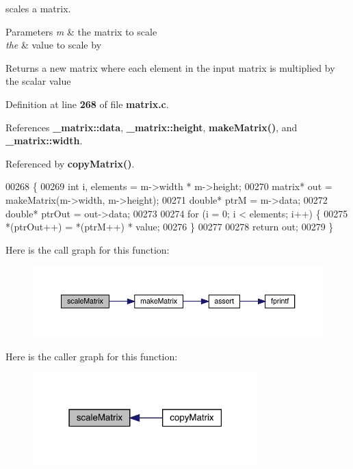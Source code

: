 scales a matrix. 


\begin{DoxyParams}{Parameters}
{\em m} & the matrix to scale \\
\hline
{\em the} & value to scale by \\
\hline
\end{DoxyParams}
\begin{DoxyReturn}{Returns}
a new matrix where each element in the input matrix is multiplied by the scalar value 
\end{DoxyReturn}


Definition at line \textbf{ 268} of file \textbf{ matrix.\+c}.



References \textbf{ \+\_\+matrix\+::data}, \textbf{ \+\_\+matrix\+::height}, \textbf{ make\+Matrix()}, and \textbf{ \+\_\+matrix\+::width}.



Referenced by \textbf{ copy\+Matrix()}.


\begin{DoxyCode}
00268                                              \{
00269     \textcolor{keywordtype}{int} i, elements = m->width * m->height;
00270     matrix* out = makeMatrix(m->width, m->height);
00271     \textcolor{keywordtype}{double}* ptrM = m->data;
00272     \textcolor{keywordtype}{double}* ptrOut = out->data;
00273 
00274     \textcolor{keywordflow}{for} (i = 0; i < elements; i++) \{
00275         *(ptrOut++) = *(ptrM++) * value;
00276     \}
00277 
00278     \textcolor{keywordflow}{return} out;
00279 \}
\end{DoxyCode}
Here is the call graph for this function\+:\nopagebreak
\begin{figure}[H]
\begin{center}
\leavevmode
\includegraphics[width=350pt]{matrix_8c_a6b7faa6ba9ee987d0777d9d0bd0e7b32_cgraph}
\end{center}
\end{figure}
Here is the caller graph for this function\+:\nopagebreak
\begin{figure}[H]
\begin{center}
\leavevmode
\includegraphics[width=247pt]{matrix_8c_a6b7faa6ba9ee987d0777d9d0bd0e7b32_icgraph}
\end{center}
\end{figure}
\mbox{\label{matrix_8c_a4794df8b2032f961dd8b2d90276bc417}} 
